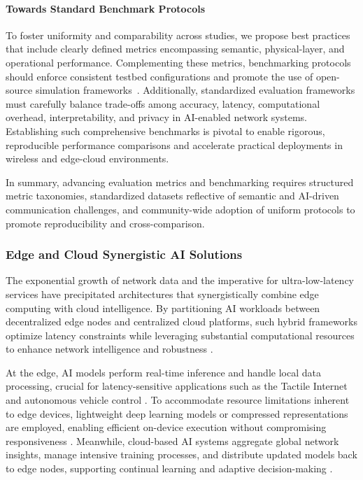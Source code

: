 \documentclass[sigconf]{acmart}
\begin{document}
\paragraph{Towards Standard Benchmark Protocols} To foster uniformity and comparability across studies, we propose best practices that include clearly defined metrics encompassing semantic, physical-layer, and operational performance. Complementing these metrics, benchmarking protocols should enforce consistent testbed configurations and promote the use of open-source simulation frameworks~\cite{ref50}. Additionally, standardized evaluation frameworks must carefully balance trade-offs among accuracy, latency, computational overhead, interpretability, and privacy in AI-enabled network systems. Establishing such comprehensive benchmarks is pivotal to enable rigorous, reproducible performance comparisons and accelerate practical deployments in wireless and edge-cloud environments.

In summary, advancing evaluation metrics and benchmarking requires structured metric taxonomies, standardized datasets reflective of semantic and AI-driven communication challenges, and community-wide adoption of uniform protocols to promote reproducibility and cross-comparison.

\subsubsection{Edge and Cloud Synergistic AI Solutions}

The exponential growth of network data and the imperative for ultra-low-latency services have precipitated architectures that synergistically combine edge computing with cloud intelligence. By partitioning AI workloads between decentralized edge nodes and centralized cloud platforms, such hybrid frameworks optimize latency constraints while leveraging substantial computational resources to enhance network intelligence and robustness \cite{ref8,ref9,ref13,ref16,ref49,ref50}.

At the edge, AI models perform real-time inference and handle local data processing, crucial for latency-sensitive applications such as the Tactile Internet and autonomous vehicle control \cite{ref10}. To accommodate resource limitations inherent to edge devices, lightweight deep learning models or compressed representations are employed, enabling efficient on-device execution without compromising responsiveness \cite{ref8,ref13}. Meanwhile, cloud-based AI systems aggregate global network insights, manage intensive training processes, and distribute updated models back to edge nodes, supporting continual learning and adaptive decision-making \cite{ref9,ref16}.
\end{document}
